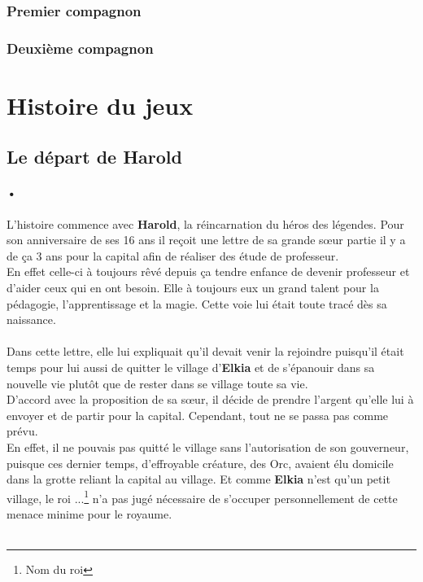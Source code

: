 \subsubsection{Premier compagnon}
\subsubsection{Deuxième compagnon}
\newpage


\section{Histoire du jeux} %
\subsection{Le départ de Harold}
\paragraph{•}L'histoire commence avec \textbf{Harold}, la réincarnation du héros des légendes. Pour son anniversaire de ses 16 ans il reçoit une lettre de sa grande sœur partie il y a de ça 3 ans pour la capital afin de réaliser des étude de professeur.\\
En effet celle-ci à toujours rêvé depuis ça tendre enfance de devenir professeur et d'aider ceux qui en ont besoin. Elle à toujours eux un grand talent pour la pédagogie, l'apprentissage et la magie. Cette voie lui était toute tracé dès sa naissance.\\\\

Dans cette lettre, elle lui expliquait qu'il devait venir la rejoindre puisqu'il était temps pour lui aussi de quitter le village d'\textbf{Elkia} et de s'épanouir dans sa nouvelle vie plutôt que de rester dans se village toute sa vie.\\
D'accord avec la proposition de sa sœur, il décide de prendre l'argent qu'elle lui à envoyer et de partir pour la capital. Cependant, tout ne se passa pas comme prévu.\\
En effet, il ne pouvais pas quitté le village sans l'autorisation de son gouverneur, puisque ces dernier temps, d'effroyable créature, des Orc, avaient élu domicile dans la grotte reliant la capital au village. Et comme \textbf{Elkia} n'est qu'un petit village, le roi ...\footnote{Nom du roi} n'a pas jugé nécessaire de s'occuper personnellement de cette menace minime pour le royaume.\\\\

